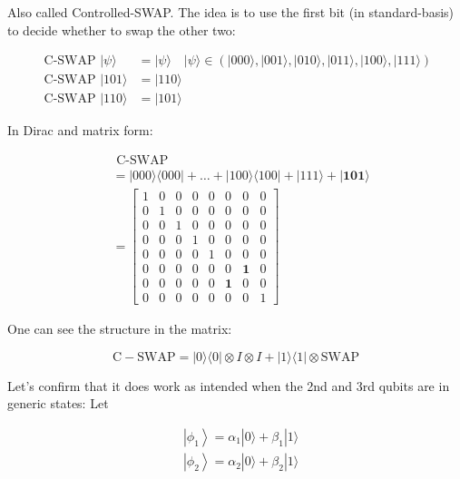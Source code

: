 \documentclass[main.tex]{subfiles}
\begin{document}
    Also called Controlled-SWAP. The idea is to use the first bit (in standard-basis) to decide whether to swap the other two:
    
    $$
    \begin{aligned}
    \text { C-SWAP }|\psi\rangle &=|\psi\rangle \quad|\psi\rangle \in(|000\rangle,|001\rangle,|010\rangle,|011\rangle,|100\rangle,|111\rangle) \\
    \text { C-SWAP }|101\rangle &=|110\rangle \\
    \text { C-SWAP }|110\rangle &=|101\rangle
    \end{aligned}
    $$
    
    In Dirac and matrix form:
    
    $$
    \begin{aligned}
    &\text { C-SWAP } \\
    &=|000\rangle\langle 000|+\ldots+| 100\rangle\langle 100|+| 111\rangle+|\mathbf{1 0 1}\rangle \\
    &=\left[\begin{array}{llllllll}
    1 & 0 & 0 & 0 & 0 & 0 & 0 & 0 \\
    0 & 1 & 0 & 0 & 0 & 0 & 0 & 0 \\
    0 & 0 & 1 & 0 & 0 & 0 & 0 & 0 \\
    0 & 0 & 0 & 1 & 0 & 0 & 0 & 0 \\
    0 & 0 & 0 & 0 & 1 & 0 & 0 & 0 \\
    0 & 0 & 0 & 0 & 0 & 0 & \mathbf{1} & 0 \\
    0 & 0 & 0 & 0 & 0 & \mathbf{1} & 0 & 0 \\
    0 & 0 & 0 & 0 & 0 & 0 & 0 & 1
    \end{array}\right]
    \end{aligned}
    $$
    
    One can see the structure in the matrix:
    
    $$
    \mathrm{C}-\mathrm{SWAP}=|0\rangle\langle 0|\otimes I \otimes I+| 1\rangle\langle 1| \otimes \mathrm{SWAP}
    $$
    
    Let's confirm that it does work as intended when the 2nd and 3rd qubits are in generic states: Let
    
    $$
    \begin{aligned}
    &\left|\phi_{1}\right\rangle=\alpha_{1}|0\rangle+\beta_{1}|1\rangle \\
    &\left|\phi_{2}\right\rangle=\alpha_{2}|0\rangle+\beta_{2}|1\rangle
    \end{aligned}
    $$
    
\end{document}
